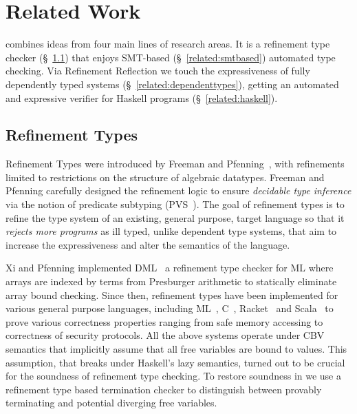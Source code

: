 \chapter{Related Work}\label{chapter:related}

\toolname combines ideas from four main lines of research areas. 
%
It is a 
refinement type checker (\S~\ref{related:refinementtypes})
that enjoys SMT-based (\S~\ref{related:smtbased}) automated type checking. 
Via Refinement Reflection we touch the expressiveness 
of fully dependently typed systems (\S~\ref{related:dependenttypes}), 
getting an automated and expressive verifier for Haskell programs (\S~\ref{related:haskell}).  
%


\section{Refinement Types}\label{related:refinementtypes}


Refinement Types were introduced by Freeman and
Pfenning~\cite{FreemanPfenning91}, with refinements limited to
restrictions on the structure of algebraic datatypes. 
%
Freeman and Pfenning carefully designed the refinement logic 
to ensure \textit{decidable type inference}
via the notion of predicate subtyping (PVS~\cite{Rushby98}).
% 
The goal of refinement types is 
to refine the type system of an existing, general purpose,  
target language so that it
\textit{rejects more programs} as ill typed, 
unlike dependent type systems, 
that aim to increase the expressiveness 
and alter the semantics of the language.

Xi and Pfenning implemented DML~\cite{pfenningxi98}
a refinement type checker for ML 
where arrays are indexed by terms 
from Presburger arithmetic to statically eliminate array bound checking. 
%
Since then, refinement types have been implemented for various general purpose languages, 
including 
ML~\cite{GordonTOPLAS2011,LiquidPLDI08},
C~\cite{deputy,LiquidPOPL10},
Racket~\cite{RefinedRacket}
and Scala~\cite{refinedscala}
to prove various correctness properties ranging from safe memory accessing 
to correctness of security protocols.
%
All the above systems operate under CBV semantics 
that implicitly assume that all free variables are bound to values. 
%
This assumption, that breaks under Haskell's lazy semantics,
turned out to be crucial for the soundness 
of refinement type checking.
To restore soundness in \toolname we 
use a refinement type based termination checker 
to distinguish between provably terminating and potential diverging free variables. 


